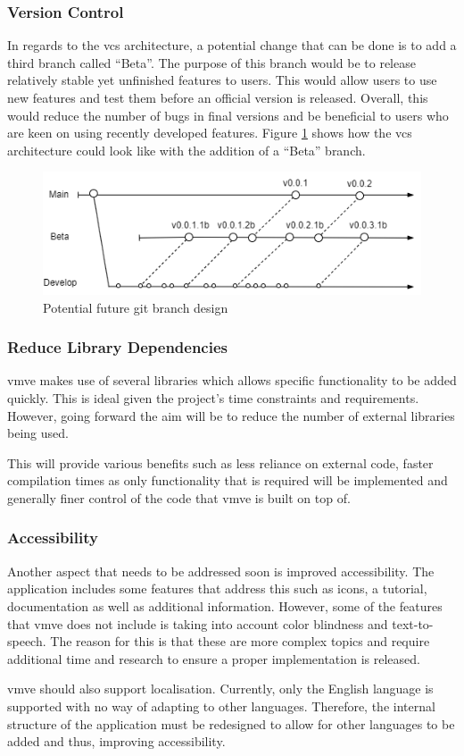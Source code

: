 \documentclass[11pt]{article}
\begin{document}
\subsubsection*{Version Control}
In regards to the \gls*{vcs} architecture, a potential change that can be done is
to add a third branch called ``Beta''. The purpose of this branch would be to
release relatively stable yet unfinished features to users. This would allow
users to use new features and test them before an official version is released.
Overall, this would reduce the number of bugs in final versions and be
beneficial to users who are keen on using recently developed features. Figure
\ref{fig:futurebrancharch} shows how the \gls*{vcs} architecture could look like
with the addition of a ``Beta'' branch.

\begin{figure}[H]
  \centering
  \includegraphics[width=\textwidth]{images/future_branch_design.png}
  \caption{Potential future git branch design}
  \label{fig:futurebrancharch}
\end{figure}

\subsubsection*{Reduce Library Dependencies}
\gls*{vmve} makes use of several libraries which allows specific functionality to
be added quickly. This is ideal given the project's time constraints and
requirements. However, going forward the aim will be to reduce the number of
external libraries being used.

This will provide various benefits such as less reliance on external code,
faster compilation times as only functionality that is required will be
implemented and generally finer control of the code that \gls*{vmve} is built on
top of.

\subsubsection*{Accessibility}
Another aspect that needs to be addressed soon is improved accessibility. The
application includes some features that address this such as icons, a tutorial,
documentation as well as additional information. However, some of the features
that \gls*{vmve} does not include is taking into account color blindness and
text-to-speech. The reason for this is that these are more complex topics and
require additional time and research to ensure a proper implementation is
released.

\gls*{vmve} should also support localisation. Currently, only the English
language is supported with no way of adapting to other languages. Therefore, the
internal structure of the application must be redesigned to allow for other
languages to be added and thus, improving accessibility.
\end{document}
